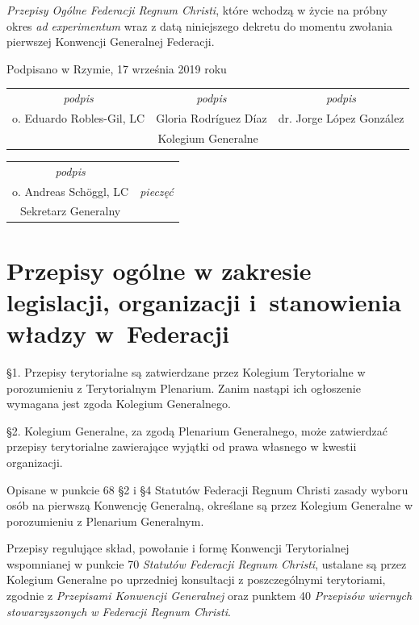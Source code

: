 \begin{framed}
\begin{footnotesize}
		{\em Przepisy Ogólne Federacji Regnum Christi}, które wchodzą w życie na próbny okres {\em ad experimentum} wraz z datą niniejszego dekretu do momentu zwołania pierwszej Konwencji Generalnej Federacji.
		\begin{center}
			Podpisano w Rzymie, 17 września 2019 roku
			\begin{tabular}
				{ c c c } {\em podpis} & {\em podpis} & {\em podpis} \\
				o. Eduardo Robles-Gil, LC & Gloria Rodríguez Díaz & dr. Jorge López González \\
				\multicolumn{3}{c}{Kolegium Generalne} 
			\end{tabular}
			\begin{tabular}
				{ c c } {\em podpis} & \\
				o. Andreas Schöggl, LC & {\em pieczęć} \\
				Sekretarz Generalny & 
			\end{tabular}
		\end{center}
	\end{footnotesize}
\end{framed}

\setlength{
\parskip}{1em}

\chapter{Przepisy ogólne w zakresie legislacji, organizacji \mbox{i stanowienia} władzy \mbox{w Federacji}}


 \S{}1. Przepisy terytorialne są zatwierdzane przez Kolegium Terytorialne w porozumieniu z Terytorialnym Plenarium. Zanim nastąpi ich ogłoszenie wymagana jest zgoda Kolegium Generalnego.

\S{}2. Kolegium Generalne, za zgodą Plenarium Generalnego, może zatwierdzać przepisy terytorialne zawierające wyjątki od prawa własnego w kwestii organizacji.


 Opisane w punkcie 68 \S{}2 i \S{}4 Statutów Federacji Regnum Christi zasady wyboru osób na pierwszą Konwencję Generalną, określane są przez Kolegium Generalne w porozumieniu z Plenarium Generalnym.


 Przepisy regulujące skład, powołanie i formę Konwencji Terytorialnej wspomnianej w punkcie 70 {\em Statutów Federacji Regnum Christi}, ustalane są przez Kolegium Generalne po uprzedniej konsultacji z poszczególnymi terytoriami, zgodnie z {\em Przepisami Konwencji Generalnej} oraz punktem 40 {\em Przepisów wiernych stowarzyszonych w Federacji Regnum Christi}.

